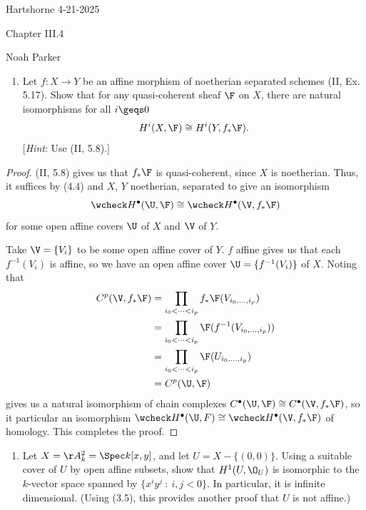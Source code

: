 \documentclass[12pt]{amsart}
\begin{document}
{Hartshorne} \hfill {4-21-2025}

\bigskip\bigskip

\begin{center}

{\sc Chapter III.4}

\end{center}

\begin{center}

  {Noah Parker} 
    
\end{center}

\bigskip\bigskip

\begin{enumerate}
  \item[4.1.] {
      Let $f:X\to Y$ be an affine morphism of noetherian separated schemes (II, Ex. 5.17).
      Show that for any quasi-coherent sheaf $\F$ on $X$, there are natural isomorphisms for all $i\geqs 0$
      \[
        H^i(X,\F)\cong H^i(Y,f_*\F).
      \] 
      [\emph{Hint}: Use (II, 5.8).]
    }
\end{enumerate}

\begin{proof}
  (II, 5.8) gives us that $f_*\F$ is quasi-coherent, since $X$ is noetherian.
  Thus, it suffices by (4.4) and $X$, $Y$ noetherian, separated to give an isomorphism
  \[
    \wcheck H^\bullet(\U,\F)\cong \wcheck H^\bullet(\V,f_*\F)
  \] 
  for some open affine covers $\U$ of $X$ and $\V$ of $Y$.

  Take $\V=\{V_i\}$ to be some open affine cover of $Y$.
  $f$ affine gives us that each $f^{-1}(V_i)$ is affine, so we have an open affine cover $\U=\{f^{-1}(V_i)\}$ of $X$.
  Noting that
  \begin{align*}
    C^p(\V,f_*\F) 
    &= \prod_{i_0<\cdots<i_p}f_*\F(V_{i_0,\ldots, i_p}) \\
    &= \prod_{i_0<\cdots<i_p}\F(f^{-1}(V_{i_0,\ldots, i_p})) \\
    &= \prod_{i_0<\cdots<i_p}\F(U_{i_0,\ldots, i_p}) \\
    &= C^p(\U,\F)
  \end{align*}
  gives us a natural isomorphism of chain complexes $C^\bullet(\U,\F)\cong C^\bullet(\V,f_*\F)$, so it particular an isomorphism $\wcheck H^\bullet(\U,F)\cong \wcheck H^\bullet(\V,f_*\F)$ of homology.
  This completes the proof.
\end{proof}

\begin{enumerate}
  \item[4.3.] {
      Let $X=\AA_k^2=\Spec k[x,y]$, and let $U=X-\{(0,0)\}$.
      Using a suitable cover of $U$ by open affine subsets, show that $H^1(U,\O_U)$ is isomorphic to the $k$-vector space spanned by $\{x^iy^j~:~i,j<0\}$.
      In particular, it is infinite dimensional.
      (Using (3.5), this provides another proof that $U$ is not affine.)
    }
\end{enumerate}
\end{document}

